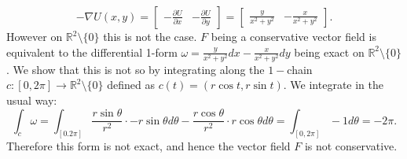 \documentclass[12pt, a4paper]{article}
\theoremstyle{definition}
\newcommand{\R}{\mathbb{R}}                           %
\newcommand{\grad}{\nabla}
\newcommand{\bmat}[1]{\begin{bmatrix}#1\end{bmatrix}}
\begin{document}
$$-\grad U(x,y) = \bmat{-\frac{\partial U}{\partial x} & -\frac{\partial U}{ \partial y}} = \bmat{\frac{y}{x^2+y^2}  & -\frac{x}{x^2+y^2}}. $$
However on $\R^2 \setminus\{0\}$ this is not the case. $F$ being a conservative vector field is equivalent to the differential 1-form $\omega = \frac{y}{x^2+y^2} dx - \frac{x}{x^2+y^2}dy $ being exact on  $\R^2 \setminus \{0\}$. We show that this is not so by integrating along the $1-$chain $c:[0,2\pi] \to \R^2 \setminus\{0\}$ defined as $c(t) = (r\cos t, r \sin  t)$. We integrate in the usual way: 
$$\int_c \omega = \int_{[0.2\pi]} \frac{r\sin \theta}{r^2} \cdot -r\sin \theta d\theta - \frac{r\cos \theta}{r^2}\cdot r \cos \theta d\theta = \int_{[0,2\pi]} -1 d \theta  = -2\pi. $$
Therefore this form is not exact, and hence the vector field $F$ is not conservative. 
\end{document}
